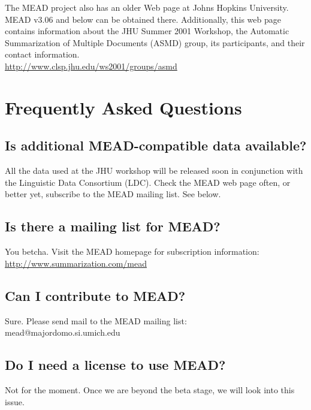 \documentclass[10pt]{article}
\begin{document}
The MEAD project also has an older Web page at Johns Hopkins University.
MEAD v3.06 and below can be obtained there.  Additionally, this
web page contains information about the JHU Summer 2001 Workshop,
the Automatic Summarization of Multiple Documents (ASMD) group,
its participants, and their contact information.\\

 \url{http://www.clsp.jhu.edu/ws2001/groups/asmd}\\



\section{Frequently Asked Questions}


\subsection{Is additional MEAD-compatible data available?}

All the data used at the JHU workshop will be released soon
in conjunction with the Linguistic Data Consortium (LDC).
Check the MEAD web page often, or better yet, subscribe to the 
MEAD mailing list.  See below.


\subsection{Is there a mailing list for MEAD?}

You betcha.  Visit the MEAD homepage for subscription information:\\

 \url{http://www.summarization.com/mead}


\subsection{Can I contribute to MEAD?}

Sure. Please send mail to the MEAD mailing list:\\

 mead@majordomo.si.umich.edu


\subsection {Do I need a license to use MEAD?}

Not for the moment. Once we are beyond the beta stage, we will
look into this issue.
\end{document}
